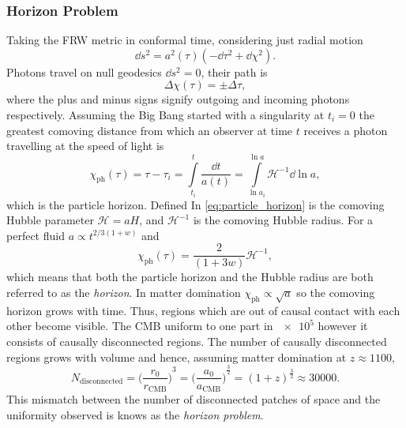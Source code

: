 \subsubsection{Horizon Problem}

Taking the FRW metric in conformal time, considering just radial motion
%
\begin{equation}
	\dd{s^{2}}
	= a^{2}(\tau)(-\dd{\tau^{2}} + \dd{\chi^{2}}).
\end{equation}
%
Photons travel on null geodesics \(\dd{s^{2}}=0\), their path is
%
\begin{equation}
	\Delta\chi(\tau)
	= \pm\Delta\tau,
\end{equation}
%
where the plus and minus signs signify outgoing and incoming photons respectively.
Assuming the Big Bang started with a singularity at \(t_{i}=0\) the greatest comoving distance from which an observer at time \(t\) receives a photon travelling at the speed of light is
%
\begin{equation}\label{eq:particle_horizon}
	\chi_{\text{ph}}(\tau)
	= \tau - \tau_{i} = \int\limits_{t_{i}}^{t} \frac{\dd{t}}{a(t)}
	= \int\limits_{\ln{a_{i}}}^{\ln{a}} \mathcal{H}^{-1} \dd{\ln{a}},
\end{equation}
%
which is the particle horizon.
Defined In \cref{eq:particle_horizon} is the comoving Hubble parameter \(\mathcal{H}=aH\), and \(\mathcal{H}^{-1}\) is the comoving Hubble radius.
For a perfect fluid \(a \propto t^{2/3(1+w)}\) and
%
\begin{equation}
	\chi_{\text{ph}}(\tau)
	= \frac{2}{(1+3w)} \mathcal{H}^{-1},
\end{equation}
%
which means that both the particle horizon and the Hubble radius are both referred to as the \emph{horizon}.
In matter domination \(\chi_{\text{ph}} \propto \sqrt{a}\) so the comoving horizon grows with time.
Thus, regions which are out of causal contact with each other become visible.
The CMB uniform to one part in \(\num{e5}\) however it consists of causally disconnected regions.
The number of causally disconnected regions grows with volume and hence, assuming matter domination at \(z \approx \num{1100}\),
%
\begin{equation}
	N_{\text{disconnected}}
		= {\bigg(\frac{r_{0}}{r_{\text{CMB}}}\bigg)}^{3}
		= {\bigg(\frac{a_{0}}{a_{\text{CMB}}}\bigg)}^{\frac{3}{2}}
		= {(1+z)}^{\frac{3}{2}}
	\approx \num{30000}.
\end{equation}
%
This mismatch between the number of disconnected patches of space and the uniformity observed is knows as the \emph{horizon problem}.

